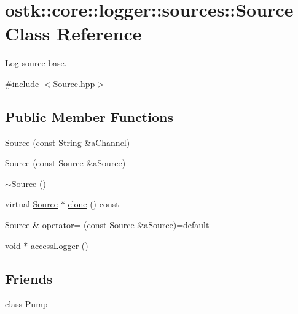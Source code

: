 \hypertarget{classostk_1_1core_1_1logger_1_1sources_1_1_source}{}\section{ostk\+:\+:core\+:\+:logger\+:\+:sources\+:\+:Source Class Reference}
\label{classostk_1_1core_1_1logger_1_1sources_1_1_source}


Log source base.  




{\ttfamily \#include $<$Source.\+hpp$>$}

\subsection*{Public Member Functions}
\begin{DoxyCompactItemize}
\item 
\hyperlink{classostk_1_1core_1_1logger_1_1sources_1_1_source_a41da7a2ae5373f66cce639177b3cc463}{Source} (const \hyperlink{classostk_1_1core_1_1types_1_1_string}{String} \&a\+Channel)
\item 
\hyperlink{classostk_1_1core_1_1logger_1_1sources_1_1_source_a5cc73c7801acb5d8c3e411ece21118cb}{Source} (const \hyperlink{classostk_1_1core_1_1logger_1_1sources_1_1_source}{Source} \&a\+Source)
\item 
\hyperlink{classostk_1_1core_1_1logger_1_1sources_1_1_source_a7b5d8956adcc78e593806111fc4e81f4}{$\sim$\+Source} ()
\item 
virtual \hyperlink{classostk_1_1core_1_1logger_1_1sources_1_1_source}{Source} $\ast$ \hyperlink{classostk_1_1core_1_1logger_1_1sources_1_1_source_acab589eb280846091323d9b7d3157fc4}{clone} () const
\item 
\hyperlink{classostk_1_1core_1_1logger_1_1sources_1_1_source}{Source} \& \hyperlink{classostk_1_1core_1_1logger_1_1sources_1_1_source_a17c7f7ee66390536117fc77c997172be}{operator=} (const \hyperlink{classostk_1_1core_1_1logger_1_1sources_1_1_source}{Source} \&a\+Source)=default
\item 
void $\ast$ \hyperlink{classostk_1_1core_1_1logger_1_1sources_1_1_source_a2101c2fe9538ed093808309eba594513}{access\+Logger} ()
\end{DoxyCompactItemize}
\subsection*{Friends}
\begin{DoxyCompactItemize}
\item 
class \hyperlink{classostk_1_1core_1_1logger_1_1sources_1_1_source_a64fbdb62a5c5f27e0d022da36aab93d9}{Pump}
\end{DoxyCompactItemize}


